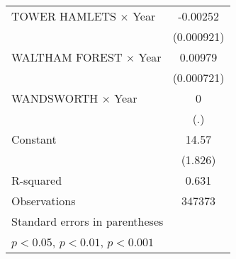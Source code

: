 {\begin{longtable}{l*{1}{c}}
\addlinespace
TOWER HAMLETS $\times$ Year&    -0.00252\sym{**} \\
                    &  (0.000921)         \\
\addlinespace
WALTHAM FOREST $\times$ Year&     0.00979\sym{***}\\
                    &  (0.000721)         \\
\addlinespace
WANDSWORTH $\times$ Year&           0         \\
                    &         (.)         \\
\addlinespace
Constant            &       14.57\sym{***}\\
                    &     (1.826)         \\
\midrule
R-squared           &       0.631         \\
Observations        &      347373         \\
\bottomrule
\multicolumn{2}{l}{\footnotesize Standard errors in parentheses}\\
\multicolumn{2}{l}{\footnotesize \sym{*} \(p<0.05\), \sym{**} \(p<0.01\), \sym{***} \(p<0.001\)}\\
\end{longtable}
\label{tab:full_MV_regression_results_w_dummy}
}
